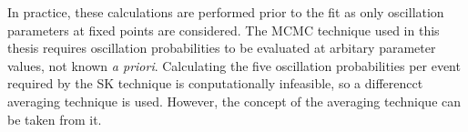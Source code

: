 
In practice, these calculations are performed prior to the fit as only oscillation parameters at fixed points are considered. The MCMC technique used in this thesis requires oscillation probabilities to be evaluated at arbitary parameter values, not known \textit{a priori}. Calculating the five oscillation probabilities per event required by the SK technique is conputationally infeasible, so a differencct averaging technique is used. However, the concept of the averaging technique can be taken from it.



